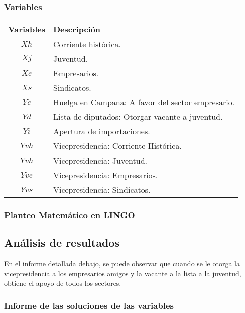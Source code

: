 \documentclass[10pt, a4paper, titlepage,
	oneside,
	fleqn, leqno]{article}
\newcommand{\attachlisting}[1]{\textattachfile{#1}{#1}}
\begin{document}
\subsubsection{Variables}

\begin{table}[h!t]
  \centering
  \begin{tabular}{ | c | p{7cm} | }
    \hline
    \textbf{Variables} & \textbf{Descripción} \\ \hline
     \(Xh\)          &  Corriente histórica. \\ \hline
     \(Xj\)          & Juventud. \\ \hline
     \(Xe\)          & Empresarios. \\ \hline
     \(Xs\)          & Sindicatos. \\ \hline
     \(Yc\)          & Huelga en Campana: A favor del sector empresario. \\ \hline
     \(Yd\)          & Lista de diputados: Otorgar vacante a juventud. \\ \hline
     \(Yi\)          & Apertura de importaciones. \\ \hline
     \(Yvh\)          & Vicepresidencia: Corriente Histórica. \\ \hline
     \(Yvh\)          & Vicepresidencia: Juventud. \\ \hline
     \(Yve\)          & Vicepresidencia: Empresarios. \\ \hline
     \(Yvs\)          & Vicepresidencia: Sindicatos. \\ \hline
  \end{tabular}

\end{table}

\subsubsection{Planteo Matemático en LINGO}
\attachlisting{tp1a.lp}

\subsection{Análisis de resultados}
En el informe detallada debajo, se puede observar que  cuando se le otorga la vicepresidencia a los empresarios amigos y la vacante a la lista a la juventud, obtiene el apoyo de todos los sectores.
\subsubsection{Informe de las soluciones de las variables}
\end{document}
